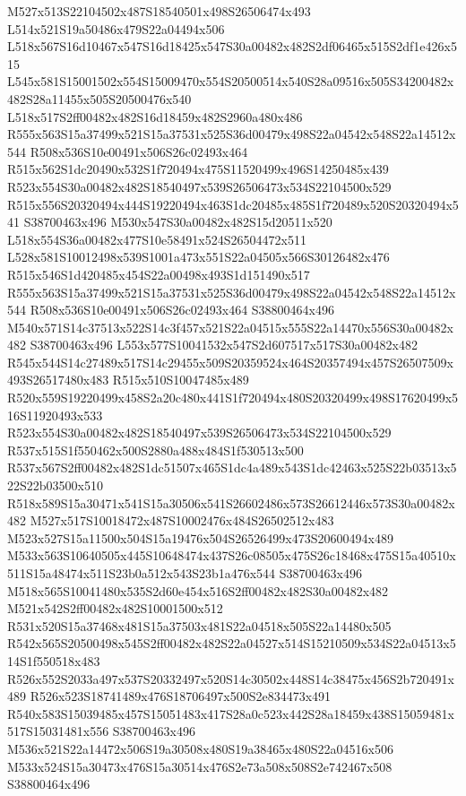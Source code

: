 \documentclass{article}
\begin{document}
\begin{multicols}{2}


M527x513S22104502x487S18540501x498S26506474x493 L514x521S19a50486x479S22a04494x506 L518x567S16d10467x547S16d18425x547S30a00482x482S2df06465x515S2df1e426x515 L545x581S15001502x554S15009470x554S20500514x540S28a09516x505S34200482x482S28a11455x505S20500476x540 L518x517S2ff00482x482S16d18459x482S2960a480x486 R555x563S15a37499x521S15a37531x525S36d00479x498S22a04542x548S22a14512x544 R508x536S10e00491x506S26c02493x464 R515x562S1dc20490x532S1f720494x475S11520499x496S14250485x439 R523x554S30a00482x482S18540497x539S26506473x534S22104500x529 R515x556S20320494x444S19220494x463S1dc20485x485S1f720489x520S20320494x541 S38700463x496 M530x547S30a00482x482S15d20511x520 L518x554S36a00482x477S10e58491x524S26504472x511 L528x581S10012498x539S1001a473x551S22a04505x566S30126482x476 R515x546S1d420485x454S22a00498x493S1d151490x517 R555x563S15a37499x521S15a37531x525S36d00479x498S22a04542x548S22a14512x544 R508x536S10e00491x506S26c02493x464 S38800464x496 M540x571S14c37513x522S14c3f457x521S22a04515x555S22a14470x556S30a00482x482 S38700463x496 L553x577S10041532x547S2d607517x517S30a00482x482 R545x544S14c27489x517S14c29455x509S20359524x464S20357494x457S26507509x493S26517480x483 R515x510S10047485x489 R520x559S19220499x458S2a20c480x441S1f720494x480S20320499x498S17620499x516S11920493x533 R523x554S30a00482x482S18540497x539S26506473x534S22104500x529 R537x515S1f550462x500S2880a488x484S1f530513x500 R537x567S2ff00482x482S1dc51507x465S1dc4a489x543S1dc42463x525S22b03513x522S22b03500x510 R518x589S15a30471x541S15a30506x541S26602486x573S26612446x573S30a00482x482 M527x517S10018472x487S10002476x484S26502512x483 M523x527S15a11500x504S15a19476x504S26526499x473S20600494x489 M533x563S10640505x445S10648474x437S26c08505x475S26c18468x475S15a40510x511S15a48474x511S23b0a512x543S23b1a476x544 S38700463x496 M518x565S10041480x535S2d60e454x516S2ff00482x482S30a00482x482 M521x542S2ff00482x482S10001500x512 R531x520S15a37468x481S15a37503x481S22a04518x505S22a14480x505 R542x565S20500498x545S2ff00482x482S22a04527x514S15210509x534S22a04513x514S1f550518x483 R526x552S2033a497x537S20332497x520S14c30502x448S14c38475x456S2b720491x489 R526x523S18741489x476S18706497x500S2e834473x491 R540x583S15039485x457S15051483x417S28a0c523x442S28a18459x438S15059481x517S15031481x556 S38700463x496 M536x521S22a14472x506S19a30508x480S19a38465x480S22a04516x506 M533x524S15a30473x476S15a30514x476S2e73a508x508S2e742467x508 S38800464x496


\end{multicols}
\end{document}
